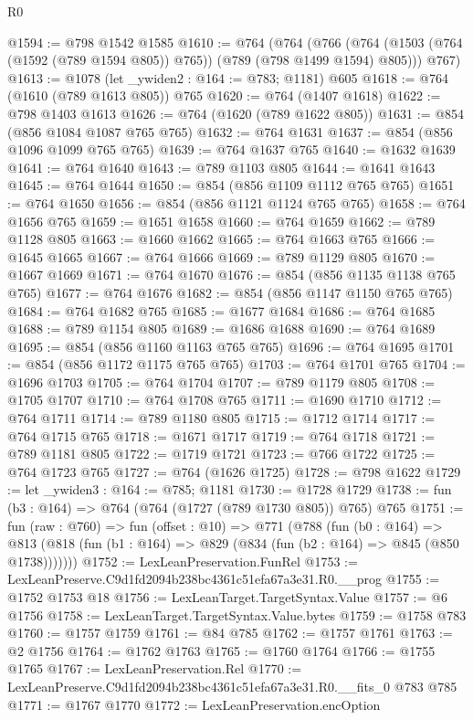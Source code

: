 \begin{lexlean}{R0}
\begin{coremodule}
@1594 := @798 @1542 @1585
@1610 := @764
    (@764
      (@766 (@764 (@1503 (@764 (@1592 (@789 @1594 @805)) @765)) (@789 (@798 @1499 @1594) @805)))
      @767)
@1613 := @1078 (let _ywiden2 : @164 := @783; @1181) @605
@1618 := @764 (@1610 (@789 @1613 @805)) @765
@1620 := @764 (@1407 @1618)
@1622 := @798 @1403 @1613
@1626 := @764 (@1620 (@789 @1622 @805))
@1631 := @854 (@856 @1084 @1087 @765 @765)
@1632 := @764 @1631
@1637 := @854 (@856 @1096 @1099 @765 @765)
@1639 := @764 @1637 @765
@1640 := @1632 @1639
@1641 := @764 @1640
@1643 := @789 @1103 @805
@1644 := @1641 @1643
@1645 := @764 @1644
@1650 := @854 (@856 @1109 @1112 @765 @765)
@1651 := @764 @1650
@1656 := @854 (@856 @1121 @1124 @765 @765)
@1658 := @764 @1656 @765
@1659 := @1651 @1658
@1660 := @764 @1659
@1662 := @789 @1128 @805
@1663 := @1660 @1662
@1665 := @764 @1663 @765
@1666 := @1645 @1665
@1667 := @764 @1666
@1669 := @789 @1129 @805
@1670 := @1667 @1669
@1671 := @764 @1670
@1676 := @854 (@856 @1135 @1138 @765 @765)
@1677 := @764 @1676
@1682 := @854 (@856 @1147 @1150 @765 @765)
@1684 := @764 @1682 @765
@1685 := @1677 @1684
@1686 := @764 @1685
@1688 := @789 @1154 @805
@1689 := @1686 @1688
@1690 := @764 @1689
@1695 := @854 (@856 @1160 @1163 @765 @765)
@1696 := @764 @1695
@1701 := @854 (@856 @1172 @1175 @765 @765)
@1703 := @764 @1701 @765
@1704 := @1696 @1703
@1705 := @764 @1704
@1707 := @789 @1179 @805
@1708 := @1705 @1707
@1710 := @764 @1708 @765
@1711 := @1690 @1710
@1712 := @764 @1711
@1714 := @789 @1180 @805
@1715 := @1712 @1714
@1717 := @764 @1715 @765
@1718 := @1671 @1717
@1719 := @764 @1718
@1721 := @789 @1181 @805
@1722 := @1719 @1721
@1723 := @766 @1722
@1725 := @764 @1723 @765
@1727 := @764 (@1626 @1725)
@1728 := @798 @1622
@1729 := let _ywiden3 : @164 := @785; @1181
@1730 := @1728 @1729
@1738 := fun (b3 : @164) => @764 (@764 (@1727 (@789 @1730 @805)) @765) @765
@1751 := fun (raw : @760) =>
  fun (offset : @10) =>
  @771
    (@788
      (fun (b0 : @164) =>
      @813 (@818 (fun (b1 : @164) => @829 (@834 (fun (b2 : @164) => @845 (@850 @1738)))))))
@1752 := LexLeanPreservation.FunRel
@1753 := LexLeanPreserve.C9d1fd2094b238bc4361c51efa67a3e31.R0.__prog
@1755 := @1752 @1753 @18
@1756 := LexLeanTarget.TargetSyntax.Value
@1757 := @6 @1756
@1758 := LexLeanTarget.TargetSyntax.Value.bytes
@1759 := @1758 @783
@1760 := @1757 @1759
@1761 := @84 @785
@1762 := @1757 @1761
@1763 := @2 @1756
@1764 := @1762 @1763
@1765 := @1760 @1764
@1766 := @1755 @1765
@1767 := LexLeanPreservation.Rel
@1770 := LexLeanPreserve.C9d1fd2094b238bc4361c51efa67a3e31.R0.__fits_0 @783 @785
@1771 := @1767 @1770
@1772 := LexLeanPreservation.encOption

\end{coremodule}
\end{lexlean}
